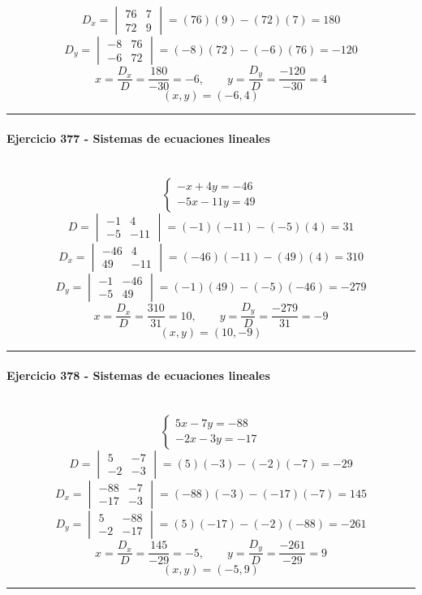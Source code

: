 \documentclass[10pt,a4paper]{article}
\newcommand{\res}[1]{\paragraph{#1}\mbox{}\\[-1.2em]}
\begin{document}
\[ D_x=\begin{vmatrix}76&7\\72&9\end{vmatrix}=(76)(9)-(72)(7)=180 \]
\[ D_y=\begin{vmatrix}-8&76\\-6&72\end{vmatrix}=(-8)(72)-(-6)(76)=-120 \]
\[ x=\frac{D_x}{D}=\frac{180}{-30}=-6,\qquad y=\frac{D_y}{D}=\frac{-120}{-30}=4 \]
\[ \boxed{(x,y)=(-6,4)} \]
\vspace{1mm}\hrule\vspace{2mm}
\res{Ejercicio 377 - Sistemas de ecuaciones lineales}
\[ \begin{cases}- x + 4 y=-46\\- 5 x - 11 y=49\end{cases} \]
\[ D=\begin{vmatrix}-1&4\\-5&-11\end{vmatrix}=(-1)(-11)-(-5)(4)=31 \]
\[ D_x=\begin{vmatrix}-46&4\\49&-11\end{vmatrix}=(-46)(-11)-(49)(4)=310 \]
\[ D_y=\begin{vmatrix}-1&-46\\-5&49\end{vmatrix}=(-1)(49)-(-5)(-46)=-279 \]
\[ x=\frac{D_x}{D}=\frac{310}{31}=10,\qquad y=\frac{D_y}{D}=\frac{-279}{31}=-9 \]
\[ \boxed{(x,y)=(10,-9)} \]
\vspace{1mm}\hrule\vspace{2mm}
\res{Ejercicio 378 - Sistemas de ecuaciones lineales}
\[ \begin{cases}5 x - 7 y=-88\\- 2 x - 3 y=-17\end{cases} \]
\[ D=\begin{vmatrix}5&-7\\-2&-3\end{vmatrix}=(5)(-3)-(-2)(-7)=-29 \]
\[ D_x=\begin{vmatrix}-88&-7\\-17&-3\end{vmatrix}=(-88)(-3)-(-17)(-7)=145 \]
\[ D_y=\begin{vmatrix}5&-88\\-2&-17\end{vmatrix}=(5)(-17)-(-2)(-88)=-261 \]
\[ x=\frac{D_x}{D}=\frac{145}{-29}=-5,\qquad y=\frac{D_y}{D}=\frac{-261}{-29}=9 \]
\[ \boxed{(x,y)=(-5,9)} \]
\vspace{1mm}\hrule\vspace{2mm}
\end{document}
